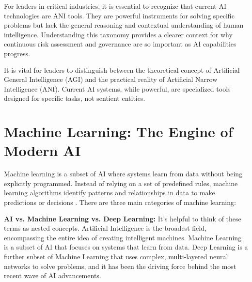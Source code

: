 For leaders in critical industries, it is essential to recognize that current AI technologies are ANI tools. They are powerful instruments for solving specific problems but lack the general reasoning and contextual understanding of human intelligence. Understanding this taxonomy provides a clearer context for why continuous risk assessment and governance are so important as AI capabilities progress.

\begin{notebox}
It is vital for leaders to distinguish between the theoretical concept of Artificial General Intelligence (AGI) and the practical reality of Artificial Narrow Intelligence (ANI). Current AI systems, while powerful, are specialized tools designed for specific tasks, not sentient entities.
\end{notebox}

\section{Machine Learning: The Engine of Modern AI}
\label{sec:machine_learning}
Machine learning is a subset of AI where systems learn from data without being explicitly programmed. Instead of relying on a set of predefined rules, machine learning algorithms identify patterns and relationships in data to make predictions or decisions \parencite{Samuel1959}. There are three main categories of machine learning:

\begin{notebox}
\textbf{AI vs. Machine Learning vs. Deep Learning:} It's helpful to think of these terms as nested concepts. Artificial Intelligence is the broadest field, encompassing the entire idea of creating intelligent machines. Machine Learning is a subset of AI that focuses on systems that learn from data. Deep Learning is a further subset of Machine Learning that uses complex, multi-layered neural networks to solve problems, and it has been the driving force behind the most recent wave of AI advancements.
\end{notebox}

